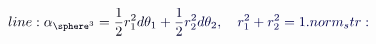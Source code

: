 \documentclass[12pt]{article}
\begin{document}
\makeatletter
\renewcommand*{\@textcolor}[3]{%
  \protect\leavevmode
  \begingroup
    \color#1{#2}#3%
  \endgroup
}
\makeatother
\begin{displaymath}
\mathcolor[RGB]{0,0,15}{line:
\alpha_{\sphere^3}=\frac{1}{2}r_1^2} \mathcolor[RGB]{0,0,30}{d\theta_1} \mathcolor[RGB]{0,0,45}{+\frac{1}{2}} \mathcolor[RGB]{0,0,60}{r_2^2d\theta_2,\quad} \mathcolor[RGB]{0,0,75}{r_1^2+r_2^2=1.

norm_str:}
\end{displaymath}
\end{document}
